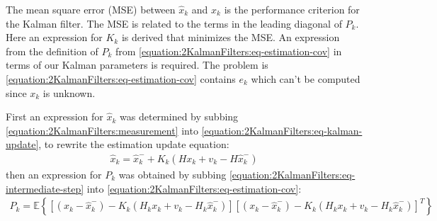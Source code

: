 \documentclass[letterpaper,10pt,english]{jupyterBook}
\begin{document}
\sphinxAtStartPar
The mean square error (MSE) between \(\hat{x}_k\) and \(x_k\) is the performance criterion for the Kalman filter. The MSE is related to the terms in the leading diagonal of \(P_k\). Here an expression for \(K_k\) is derived that minimizes the MSE. An expression from the definition of \(P_k\) from \eqref{equation:2KalmanFilters:eq-estimation-cov} in terms of our Kalman parameters is required. The problem is \eqref{equation:2KalmanFilters:eq-estimation-cov} contains \(e_k\) which can’t be computed since \(x_k\) is unknown.

\sphinxAtStartPar
First an expression for \(\hat{x}_k\)  was determined by subbing \eqref{equation:2KalmanFilters:measurement} into \eqref{equation:2KalmanFilters:eq-kalman-update}, to rewrite the estimation update equation:
\begin{equation}\label{equation:2KalmanFilters:eq-intermediate-step}
\begin{split}\hat{x}_k = \hat{x}^-_k + K_k(Hx_k+v_k-H\hat{x}^-_k)\end{split}
\end{equation}
\sphinxAtStartPar
then an expression for \(P_k\) was obtained by subbing \eqref{equation:2KalmanFilters:eq-intermediate-step} into \eqref{equation:2KalmanFilters:eq-estimation-cov}:
\begin{equation}\label{equation:2KalmanFilters:eq-expectation}
\begin{split}P_k = \mathbb{E} \left\{ 
\left[ 
(x_k - \hat{x}_k^-) - K_k \left( H_k {x}_k + v_k - H_k \hat{x}_k^- \right)
\right]
\left[ 
(x_k - \hat{x}_k^-) - K_k \left( H_k {x}_k + v_k - H_k \hat{x}_k^- \right)
\right]^T
\right\}\end{split}
\end{equation}
\end{document}
